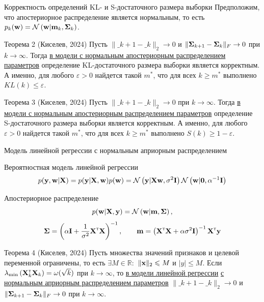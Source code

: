 \documentclass{beamer}
\begin{document}
\begin{frame}{Корректность определений KL- и S-достаточного размера выборки}
    Предположим, что апостериорное распределение является нормальным, то есть $p_k(\mathbf{w}) = \mathcal{N}\left( \mathbf{w} | \mathbf{m}_k, \boldsymbol{\Sigma}_k \right)$.
    \begin{block}{Теорема 2 (Киселев, 2024)}
            Пусть $\| \bm_{k+1} - \bm_k \|_2 \to 0$ и $\| \boldsymbol{\Sigma}_{k+1} - \boldsymbol{\Sigma}_k \|_{F} \to 0$ при $k \to \infty$. Тогда \underline{в модели с нормальным апостериорным распределением параметров} определение KL-достаточного размера выборки является корректным. А именно, для любого $\varepsilon > 0$ найдется такой $m^*$, что для всех $k \geqslant m^*$ выполнено $KL(k) \leqslant \varepsilon$.
    \end{block}
    \begin{block}{Теорема 3 (Киселев, 2024)}
        Пусть $\| \bm_{k+1} - \bm_k \|_2 \to 0$ при $k \to \infty$. Тогда \underline{в модели с нормальным апостериорным распределением параметров} определение S-достаточного размера выборки является корректным. А именно, для любого $\varepsilon > 0$ найдется такой $m^*$, что для всех $k \geqslant m^*$ выполнено $S(k) \geqslant 1-\varepsilon$.
    \end{block}
\end{frame}

\begin{frame}{Модель линейной регрессии с нормальным априорным распределением}
    \begin{block}{Вероятностная модель линейной регрессии}
        \vspace{-0.3cm}
        \[ p(\mathbf{y}, \mathbf{w} | \mathbf{X}) = p(\mathbf{y} | \mathbf{X}, \mathbf{w}) p(\mathbf{w}) = \mathcal{N}\left( \mathbf{y} | \mathbf{X} \mathbf{w}, \sigma^2 \mathbf{I} \right) \mathcal{N}\left( \mathbf{w} | \mathbf{0}, \alpha^{-1} \mathbf{I} \right) \]
        \vspace{-0.7cm}
    \end{block}
    \begin{block}{Апостериорное распределение}
        \vspace{-0.3cm}
        \[ p(\mathbf{w} | \mathbf{X}, \mathbf{y}) = \mathcal{N}\left( \mathbf{w} | \mathbf{m}, \boldsymbol{\Sigma} \right), \]
        \[ \boldsymbol{\Sigma} = \left( \alpha \mathbf{I} + \dfrac{1}{\sigma^2} \mathbf{X}^{\text{\tiny\sffamily\upshape\mdseries T}} \mathbf{X} \right)^{-1}, \qquad \mathbf{m} = \left( \mathbf{X}^{\text{\tiny\sffamily\upshape\mdseries T}} \mathbf{X} + \alpha \sigma^2 \mathbf{I} \right)^{-1} \mathbf{X}^{\text{\tiny\sffamily\upshape\mdseries T}} \mathbf{y} \]
        \vspace{-0.5cm}
    \end{block}
    \begin{block}{Теорема 4 (Киселев, 2024)}
        Пусть множества значений признаков и целевой переменной ограничены, то есть $\exists M \in \mathbb{R}:$ $\| \mathbf{x} \|_2 \leqslant M$ и $|y| \leqslant M$. Если  $\lambda_{\min}\left( \mathbf{X}^{\text{\tiny\sffamily\upshape\mdseries T}}_k \mathbf{X}_k \right) = \omega(\sqrt{k})$ при $k \to \infty$, то \underline{в модели линейной регрессии} \underline{с нормальным априорным распределением параметров} $\| \bm_{k+1} - \bm_k \|_2 \to 0$ и  $\| \boldsymbol{\Sigma}_{k+1} - \boldsymbol{\Sigma}_k \|_{F} \to 0$ при $k \to \infty$.
    \end{block}
\end{frame}
\end{document}
